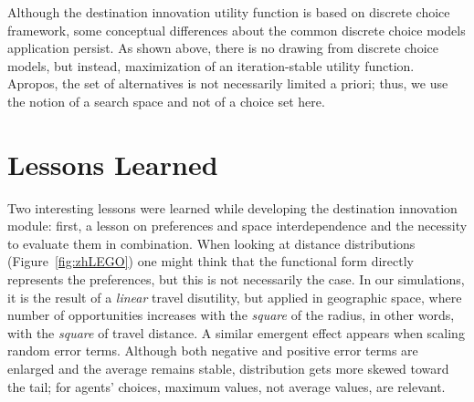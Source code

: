 
Although the destination innovation utility function is based on discrete choice framework, some conceptual differences about the common discrete choice models application persist. 
As shown above, there is no drawing from discrete choice models, but instead, maximization of an iteration-stable utility function. 
Apropos, the set of alternatives is not necessarily limited a priori; thus, we use the notion of a search space and not of a choice set here.

\section{Lessons Learned}
Two interesting lessons were learned while developing the destination innovation module: 
first, a lesson on preferences and space interdependence and the necessity to evaluate them in combination. 
When looking at distance distributions (\eg Figure~\ref{fig:zhLEGO}) one might think that the functional form directly represents the preferences, but 
this is not necessarily the case. 
In our simulations, it is the result of a \emph{linear} travel disutility, but applied in geographic space, where number of opportunities increases with the \emph{square} of the radius, in other words, with the \emph{square} of travel distance. 
A similar emergent effect appears when scaling random error terms. 
Although both negative and positive error terms are enlarged and the average remains stable, distribution gets more skewed toward the tail; for agents' choices,  maximum values, not average values, are relevant.

